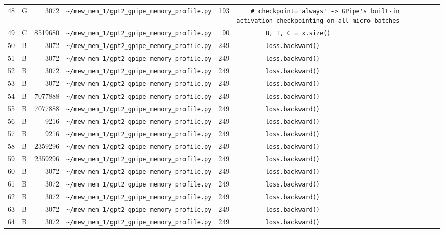 \documentclass{article}
\begin{document}
\begin{longtable}{r l r p{6.5cm} r p{7.0cm}}
48 & G & 3072 & \lstinline|~/mew_mem_1/gpt2_gpipe_memory_profile.py| & 193 & \lstinline|    # checkpoint='always' -> GPipe's built-in activation checkpointing on all micro-batches| \\
49 & C & 8519680 & \lstinline|~/mew_mem_1/gpt2_gpipe_memory_profile.py| & 90 & \lstinline|        B, T, C = x.size()| \\
50 & B & 3072 & \lstinline|~/mew_mem_1/gpt2_gpipe_memory_profile.py| & 249 & \lstinline|        loss.backward()| \\
51 & B & 3072 & \lstinline|~/mew_mem_1/gpt2_gpipe_memory_profile.py| & 249 & \lstinline|        loss.backward()| \\
52 & B & 3072 & \lstinline|~/mew_mem_1/gpt2_gpipe_memory_profile.py| & 249 & \lstinline|        loss.backward()| \\
53 & B & 3072 & \lstinline|~/mew_mem_1/gpt2_gpipe_memory_profile.py| & 249 & \lstinline|        loss.backward()| \\
54 & B & 7077888 & \lstinline|~/mew_mem_1/gpt2_gpipe_memory_profile.py| & 249 & \lstinline|        loss.backward()| \\
55 & B & 7077888 & \lstinline|~/mew_mem_1/gpt2_gpipe_memory_profile.py| & 249 & \lstinline|        loss.backward()| \\
56 & B & 9216 & \lstinline|~/mew_mem_1/gpt2_gpipe_memory_profile.py| & 249 & \lstinline|        loss.backward()| \\
57 & B & 9216 & \lstinline|~/mew_mem_1/gpt2_gpipe_memory_profile.py| & 249 & \lstinline|        loss.backward()| \\
58 & B & 2359296 & \lstinline|~/mew_mem_1/gpt2_gpipe_memory_profile.py| & 249 & \lstinline|        loss.backward()| \\
59 & B & 2359296 & \lstinline|~/mew_mem_1/gpt2_gpipe_memory_profile.py| & 249 & \lstinline|        loss.backward()| \\
60 & B & 3072 & \lstinline|~/mew_mem_1/gpt2_gpipe_memory_profile.py| & 249 & \lstinline|        loss.backward()| \\
61 & B & 3072 & \lstinline|~/mew_mem_1/gpt2_gpipe_memory_profile.py| & 249 & \lstinline|        loss.backward()| \\
62 & B & 3072 & \lstinline|~/mew_mem_1/gpt2_gpipe_memory_profile.py| & 249 & \lstinline|        loss.backward()| \\
63 & B & 3072 & \lstinline|~/mew_mem_1/gpt2_gpipe_memory_profile.py| & 249 & \lstinline|        loss.backward()| \\
64 & B & 3072 & \lstinline|~/mew_mem_1/gpt2_gpipe_memory_profile.py| & 249 & \lstinline|        loss.backward()| \\

\end{longtable}
\end{document}

